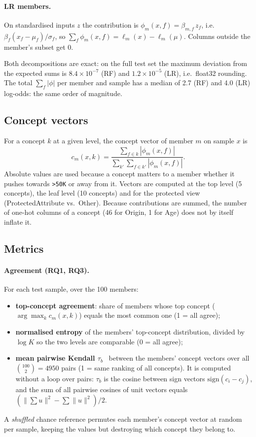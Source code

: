 \documentclass[11pt,a4paper]{article}
\newcommand{\concept}[1]{\textsf{#1}}
\begin{document}
\paragraph{LR members.}
On standardised inputs $z$ the contribution is $\phi_m(x,f) = \beta_{m,f}\, z_f$, i.e.\
$\beta_f (x_f - \mu_f)/\sigma_f$, so $\sum_f \phi_m(x,f) = \ell_m(x) - \ell_m(\mu)$. Columns outside the
member's subset get 0.

Both decompositions are exact: on the full test set the maximum deviation from the expected sums is
$8.4\times10^{-7}$ (RF) and $1.2\times10^{-5}$ (LR), i.e.\ float32 rounding. The total $\sum_f|\phi|$ per member
and sample has a median of 2.7 (RF) and 4.0 (LR) log-odds: the same order of magnitude.

\subsection{Concept vectors}
For a concept $k$ at a given level, the concept vector of member $m$ on sample $x$ is
\begin{equation}
  c_m(x,k) = \frac{\sum_{f \in k} |\phi_m(x,f)|}{\sum_{k'} \sum_{f \in k'} |\phi_m(x,f)|}.
\end{equation}
Absolute values are used because a concept matters to a member whether it pushes towards \texttt{>50K} or away
from it. Vectors are computed at the top level (5 concepts), the leaf level (10 concepts) and for the protected
view (\concept{ProtectedAttribute} vs.\ \concept{Other}). Because contributions are summed, the number of one-hot
columns of a concept (46 for \concept{Origin}, 1 for \concept{Age}) does not by itself inflate it.

\subsection{Metrics}
\paragraph{Agreement (RQ1, RQ3).} For each test sample, over the 100 members:
\begin{itemize}
  \item \textbf{top-concept agreement}: share of members whose top concept ($\arg\max_k c_m(x,k)$) equals the most
    common one (1 = all agree);
  \item \textbf{normalised entropy} of the members' top-concept distribution, divided by $\log K$ so the two levels
    are comparable (0 = all agree);
  \item \textbf{mean pairwise Kendall $\tau_b$}~\cite{kendall1945ties} between the members' concept vectors over
    all $\binom{100}{2}=4950$ pairs (1 = same ranking of all concepts). It is computed without a loop over pairs:
    $\tau_b$ is the cosine between sign vectors $\mathrm{sign}(c_i - c_j)$, and the sum of all pairwise cosines
    of unit vectors equals $(\|\sum u\|^2 - \sum\|u\|^2)/2$.
\end{itemize}
A \emph{shuffled} chance reference permutes each member's concept vector at random per sample, keeping the
values but destroying which concept they belong to.
\end{document}
